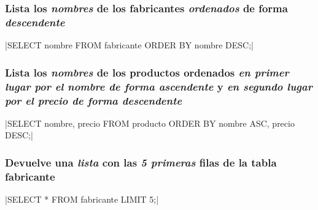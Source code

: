\documentclass[12pt, letterpaper]{article}
\begin{document}
  \subsubsection{Lista los \textit{\textbf{nombres}} de los fabricantes \textit{\textbf{ordenados}} de forma \textit{\textbf{descendente}}}
   |SELECT nombre FROM fabricante ORDER BY nombre DESC;|

  \subsubsection{Lista los \textit{\textbf{nombres}} de los productos ordenados \textit{\textbf{en primer lugar por el nombre de forma ascendente}} y \textit{\textbf{en segundo lugar por el precio de forma descendente}} }
   |SELECT nombre, precio FROM producto ORDER BY nombre ASC, precio DESC;|

   \subsubsection{Devuelve una \textit{\textbf{lista}} con las \textit{\textbf{5 primeras}} filas de la tabla \colorbox{myGray}{fabricante}}
    |SELECT * FROM fabricante LIMIT 5;|
\end{document}
